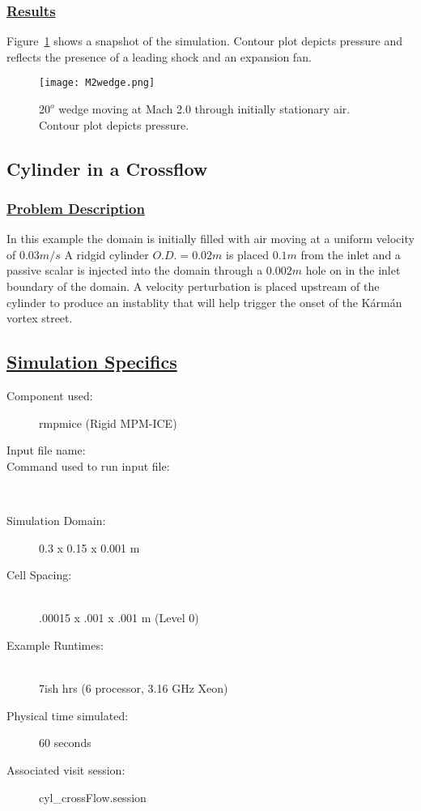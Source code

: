 \newpage

\subsubsection*{\underline{Results}}

Figure~\ref{figwedge} shows a snapshot of the simulation.  Contour
plot depicts pressure and reflects the presence of a leading shock
and an expansion fan.
\begin{figure}
  \center
  \texttt{[image: M2wedge.png]}

  \caption{$20^o$ wedge moving at Mach 2.0 through initially stationary
air.  Contour plot depicts pressure.}
  \label{figwedge}
\end{figure}
\newpage
%
\subsection*{\center Cylinder in a Crossflow}
\subsubsection*{\underline{Problem Description}}
In this example the domain is initially filled with air moving at a uniform velocity of $0.03m/s$  A ridgid cylinder $O.D. = 0.02m$ is placed $0.1m$ from the inlet and a passive scalar is injected into the domain through a $0.002m$ hole on in the inlet boundary of the domain.  A velocity perturbation is placed upstream of the cylinder to produce an instablity that will help trigger the onset of the K\'arm\'an vortex street.
%
\subsection*{\underline{Simulation Specifics}}
\begin{description}
\item [Component used:] \hfill rmpmice (Rigid MPM-ICE)
\item [Input file name:] \hfill {}
\item [Command used to run input file:]\hfill \\

\item [Simulation Domain:]\hfill    0.3 x 0.15 x 0.001 m

\item [Cell Spacing:]\hfill \\
.00015 x .001 x .001 m (Level 0)

\item [Example Runtimes:] \hfill \\
 7ish hrs   (6 processor, 3.16 GHz Xeon)\\

\item [Physical time simulated:] \hfill 60 seconds

\item [Associated visit session:] \hfill cyl\_crossFlow.session

\end{description}

